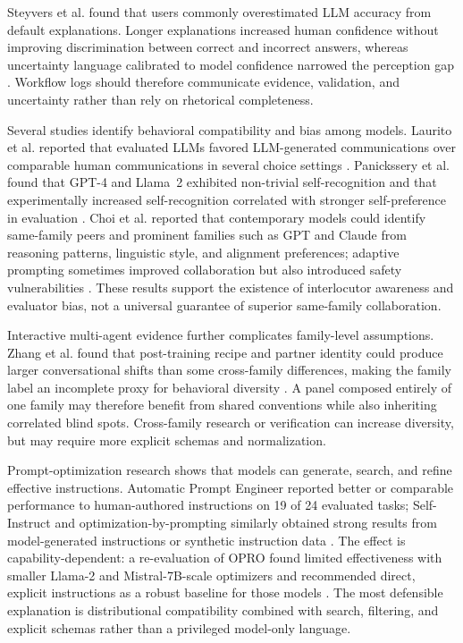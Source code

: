 \documentclass[11pt,a4paper]{article}
\begin{document}
Steyvers et al. found that users commonly overestimated LLM accuracy from default explanations. Longer explanations increased human confidence without improving discrimination between correct and incorrect answers, whereas uncertainty language calibrated to model confidence narrowed the perception gap \cite{steyvers2025}. Workflow logs should therefore communicate evidence, validation, and uncertainty rather than rely on rhetorical completeness.

Several studies identify behavioral compatibility and bias among models. Laurito et al. reported that evaluated LLMs favored LLM-generated communications over comparable human communications in several choice settings \cite{laurito2025}. Panickssery et al. found that GPT-4 and Llama~2 exhibited non-trivial self-recognition and that experimentally increased self-recognition correlated with stronger self-preference in evaluation \cite{panickssery2024}. Choi et al. reported that contemporary models could identify same-family peers and prominent families such as GPT and Claude from reasoning patterns, linguistic style, and alignment preferences; adaptive prompting sometimes improved collaboration but also introduced safety vulnerabilities \cite{choi2025interlocutor}. These results support the existence of interlocutor awareness and evaluator bias, not a universal guarantee of superior same-family collaboration.

Interactive multi-agent evidence further complicates family-level assumptions. Zhang et al. found that post-training recipe and partner identity could produce larger conversational shifts than some cross-family differences, making the family label an incomplete proxy for behavioral diversity \cite{zhang2026posttraining}. A panel composed entirely of one family may therefore benefit from shared conventions while also inheriting correlated blind spots. Cross-family research or verification can increase diversity, but may require more explicit schemas and normalization.

Prompt-optimization research shows that models can generate, search, and refine effective instructions. Automatic Prompt Engineer reported better or comparable performance to human-authored instructions on 19 of 24 evaluated tasks; Self-Instruct and optimization-by-prompting similarly obtained strong results from model-generated instructions or synthetic instruction data \cite{zhou2022ape,wang2023selfinstruct,yang2023opro}. The effect is capability-dependent: a re-evaluation of OPRO found limited effectiveness with smaller Llama-2 and Mistral-7B-scale optimizers and recommended direct, explicit instructions as a robust baseline for those models \cite{zhang2024opro}. The most defensible explanation is distributional compatibility combined with search, filtering, and explicit schemas rather than a privileged model-only language.
\end{document}
